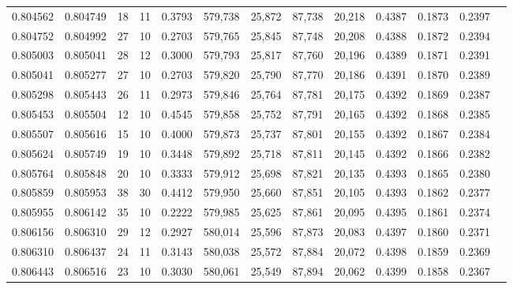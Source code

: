 \begin{tabular}{rrrrrrrrrrrrr}
0.804562 & 0.804749 &    18 &  11 &                                     0.3793 & 579,738 &  25,872 &  87,738 &  20,218 & 0.4387 & 0.1873 & 0.2397 \\
0.804752 & 0.804992 &    27 &  10 &                                     0.2703 & 579,765 &  25,845 &  87,748 &  20,208 & 0.4388 & 0.1872 & 0.2394 \\
0.805003 & 0.805041 &    28 &  12 &                                     0.3000 & 579,793 &  25,817 &  87,760 &  20,196 & 0.4389 & 0.1871 & 0.2391 \\
0.805041 & 0.805277 &    27 &  10 &                                     0.2703 & 579,820 &  25,790 &  87,770 &  20,186 & 0.4391 & 0.1870 & 0.2389 \\
0.805298 & 0.805443 &    26 &  11 &                                     0.2973 & 579,846 &  25,764 &  87,781 &  20,175 & 0.4392 & 0.1869 & 0.2387 \\
0.805453 & 0.805504 &    12 &  10 &                                     0.4545 & 579,858 &  25,752 &  87,791 &  20,165 & 0.4392 & 0.1868 & 0.2385 \\
0.805507 & 0.805616 &    15 &  10 &                                     0.4000 & 579,873 &  25,737 &  87,801 &  20,155 & 0.4392 & 0.1867 & 0.2384 \\
0.805624 & 0.805749 &    19 &  10 &                                     0.3448 & 579,892 &  25,718 &  87,811 &  20,145 & 0.4392 & 0.1866 & 0.2382 \\
0.805764 & 0.805848 &    20 &  10 &                                     0.3333 & 579,912 &  25,698 &  87,821 &  20,135 & 0.4393 & 0.1865 & 0.2380 \\
0.805859 & 0.805953 &    38 &  30 &                                     0.4412 & 579,950 &  25,660 &  87,851 &  20,105 & 0.4393 & 0.1862 & 0.2377 \\
0.805955 & 0.806142 &    35 &  10 &                                     0.2222 & 579,985 &  25,625 &  87,861 &  20,095 & 0.4395 & 0.1861 & 0.2374 \\
0.806156 & 0.806310 &    29 &  12 &                                     0.2927 & 580,014 &  25,596 &  87,873 &  20,083 & 0.4397 & 0.1860 & 0.2371 \\
0.806310 & 0.806437 &    24 &  11 &                                     0.3143 & 580,038 &  25,572 &  87,884 &  20,072 & 0.4398 & 0.1859 & 0.2369 \\
0.806443 & 0.806516 &    23 &  10 &                                     0.3030 & 580,061 &  25,549 &  87,894 &  20,062 & 0.4399 & 0.1858 & 0.2367 \\

\end{tabular}
